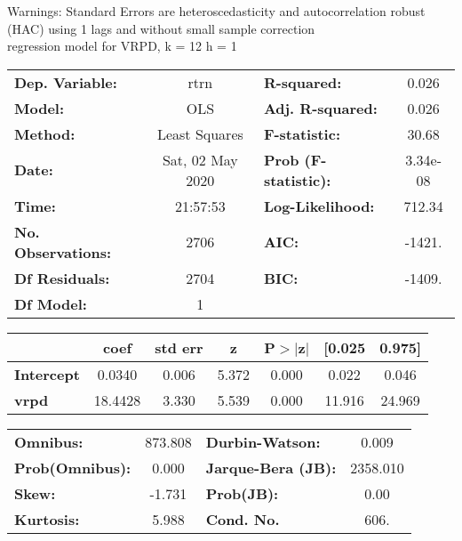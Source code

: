 Warnings: \newline
 [1] Standard Errors are heteroscedasticity and autocorrelation robust (HAC) using 1 lags and without small sample correction\\ 

regression model for VRPD, k = 12 h = 1\begin{center}
\begin{tabular}{lclc}
\toprule
\textbf{Dep. Variable:}    &       rtrn       & \textbf{  R-squared:         } &     0.026   \\
\textbf{Model:}            &       OLS        & \textbf{  Adj. R-squared:    } &     0.026   \\
\textbf{Method:}           &  Least Squares   & \textbf{  F-statistic:       } &     30.68   \\
\textbf{Date:}             & Sat, 02 May 2020 & \textbf{  Prob (F-statistic):} &  3.34e-08   \\
\textbf{Time:}             &     21:57:53     & \textbf{  Log-Likelihood:    } &    712.34   \\
\textbf{No. Observations:} &        2706      & \textbf{  AIC:               } &    -1421.   \\
\textbf{Df Residuals:}     &        2704      & \textbf{  BIC:               } &    -1409.   \\
\textbf{Df Model:}         &           1      & \textbf{                     } &             \\
\bottomrule
\end{tabular}
\begin{tabular}{lcccccc}
                   & \textbf{coef} & \textbf{std err} & \textbf{z} & \textbf{P$> |$z$|$} & \textbf{[0.025} & \textbf{0.975]}  \\
\midrule
\textbf{Intercept} &       0.0340  &        0.006     &     5.372  &         0.000        &        0.022    &        0.046     \\
\textbf{vrpd}      &      18.4428  &        3.330     &     5.539  &         0.000        &       11.916    &       24.969     \\
\bottomrule
\end{tabular}
\begin{tabular}{lclc}
\textbf{Omnibus:}       & 873.808 & \textbf{  Durbin-Watson:     } &    0.009  \\
\textbf{Prob(Omnibus):} &   0.000 & \textbf{  Jarque-Bera (JB):  } & 2358.010  \\
\textbf{Skew:}          &  -1.731 & \textbf{  Prob(JB):          } &     0.00  \\
\textbf{Kurtosis:}      &   5.988 & \textbf{  Cond. No.          } &     606.  \\
\bottomrule
\end{tabular}
\end{center}

